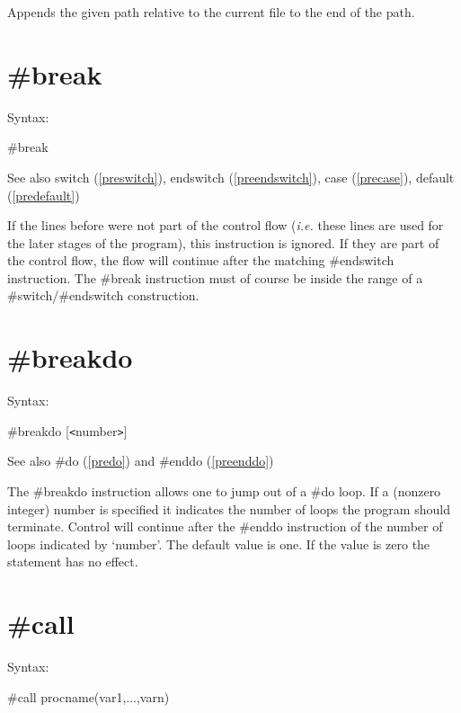 \noindent Appends the given path relative to the current file to the end of
the \FORM{} path.


\section{\#break}
\label{prebreak}

\noindent Syntax:

\#break
 
\noindent See also switch (\ref{preswitch}),
        endswitch (\ref{preendswitch}),
        case (\ref{precase}),
        default (\ref{predefault})

\noindent If the lines before were not part of the control 
flow ({\it i.e.} these lines are used for the later stages of the program), 
this instruction is ignored. If they are part of the control flow, the flow 
will continue after the matching \#endswitch 
instruction. The \#break instruction must of course be inside the range of 
a \#switch/\#endswitch construction.

 
\section{\#breakdo}
\label{prebreakdo}

\noindent Syntax:

\#breakdo [{\tt<}number{\tt>}]

\noindent See also \#do (\ref{predo}) and \#enddo (\ref{preenddo})

\noindent The \#breakdo instruction allows one to jump out 
of a \#do loop. If a (nonzero integer) number is specified it indicates the 
number of loops the program should terminate. Control will continue after 
the \#enddo instruction of the number of loops indicated by `number'. 
The default value is one. If the value is zero the statement has no effect.


\section{\#call}
\label{precall}

\noindent Syntax:

\#call procname(var1,...,varn)
 
